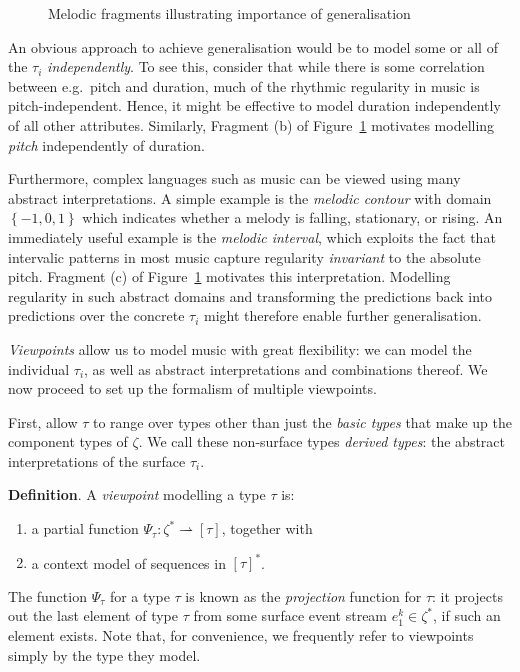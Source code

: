 \documentclass[12pt,a4paper,twoside,openright]{report}
\newcommand{\set}[1]{ \left\{ #1 \right\} }
\begin{document}
\begin{figure}[H]
\centering

\caption{Melodic fragments illustrating importance of generalisation}
\label{fig:generalise}
\end{figure}

An obvious approach to achieve generalisation would be to model some or all of
the $\tau_i$ \emph{independently}. To see this, consider that while there is
some correlation between e.g.\ pitch and duration, much of the rhythmic
regularity in music is pitch-independent. Hence, it might be effective to model
duration independently of all other attributes. Similarly, Fragment (b) of
Figure~\ref{fig:generalise} motivates modelling \emph{pitch} independently of
duration.

Furthermore, complex languages such as music can be viewed using many abstract
interpretations. A simple example is the \emph{melodic contour} with domain
$\set{-1,0,1}$ which indicates whether a melody is falling, stationary, or
rising. An immediately useful example is the \emph{melodic interval}, which
exploits the fact that intervalic patterns in most music capture regularity
\emph{invariant} to the absolute pitch. Fragment (c) of
Figure~\ref{fig:generalise} motivates this interpretation. Modelling regularity
in such abstract domains and transforming the predictions back into predictions
over the concrete $\tau_i$ might therefore enable further generalisation.

\emph{Viewpoints} allow us to model music with great flexibility: we can model
the individual $\tau_i$, as well as abstract interpretations and combinations
thereof. We now proceed to set up the formalism of multiple viewpoints.

First, allow $\tau$ to range over types other than just the \emph{basic types}
that make up the component types of $\zeta$. We call these non-surface types
\emph{derived types}: the abstract interpretations of the surface $\tau_i$. 

\textbf{Definition}. A \emph{viewpoint} modelling a type $\tau$ is:
\begin{enumerate}[label=\arabic*., itemsep=0mm]
  \item a partial function $\Psi_\tau : \zeta^* \rightharpoonup [\tau]$,
    together with
  \item a context model of sequences in $[\tau]^*$.
\end{enumerate}

The function $\Psi_\tau$ for a type $\tau$ is known as the \emph{projection}
function for $\tau$: it projects out the last element of type $\tau$ from some
surface event stream $e_1^k \in \zeta^*$, if such an element exists. Note that,
for convenience, we frequently refer to viewpoints simply by the type they
model. 
\end{document}
